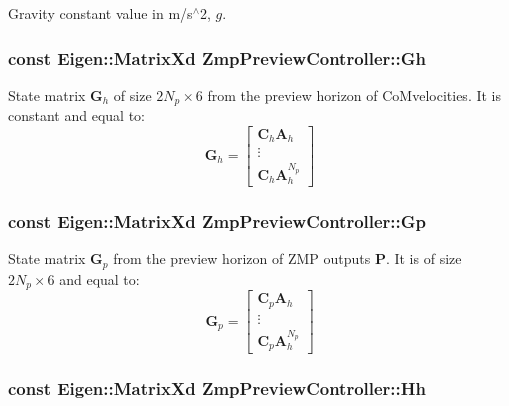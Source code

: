 \-Gravity constant value in m/s$^\wedge$2, $ g $. \hypertarget{classZmpPreviewController_a9429cb06fdd2c3ca5036a2fd48303632}{
\subsubsection[{\-Gh}]{\setlength{\rightskip}{0pt plus 5cm}const \-Eigen\-::\-Matrix\-Xd {\bf \-Zmp\-Preview\-Controller\-::\-Gh}}}\label{classZmpPreviewController_a9429cb06fdd2c3ca5036a2fd48303632}
\-State matrix $\mathbf{G}_h$ of size $2N_p \times 6$ from the preview horizon of \-Co\-Mvelocities. \-It is constant and equal to\-: \[ \mathbf{G}_h = \left[\begin{array}{c} \mathbf{C}_h\mathbf{A}_h \\ \vdots \\ \mathbf{C}_h\mathbf{A}^{N_p}_h \end{array}\right] \] \hypertarget{classZmpPreviewController_a53a7d8af5be4a5d5cea99fad2ea48979}{
\subsubsection[{\-Gp}]{\setlength{\rightskip}{0pt plus 5cm}const \-Eigen\-::\-Matrix\-Xd {\bf \-Zmp\-Preview\-Controller\-::\-Gp}}}\label{classZmpPreviewController_a53a7d8af5be4a5d5cea99fad2ea48979}
\-State matrix $\mathbf{G}_p$ from the preview horizon of \-Z\-M\-P outputs $\mathbf{P}$. \-It is of size $2N_p \times 6$ and equal to\-: \[ \mathbf{G}_p = \left[\begin{array}{c} \mathbf{C}_p\mathbf{A}_h \\ \vdots \\ \mathbf{C}_p\mathbf{A}^{N_p}_h \end{array}\right] \] \hypertarget{classZmpPreviewController_a8caaf8bf8f06e5b0b53d2cd5c131eefd}{
\subsubsection[{\-Hh}]{\setlength{\rightskip}{0pt plus 5cm}const \-Eigen\-::\-Matrix\-Xd {\bf \-Zmp\-Preview\-Controller\-::\-Hh}}}\label{classZmpPreviewController_a8caaf8bf8f06e5b0b53d2cd5c131eefd}
